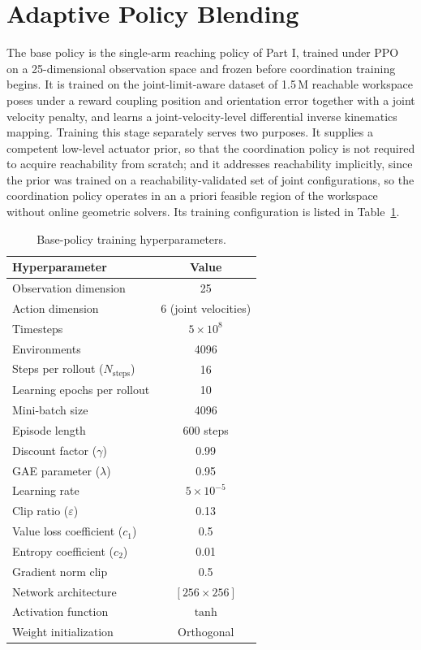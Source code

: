 \section{Adaptive Policy Blending}\label{sec:alpha_blending}

The base policy is the single-arm reaching policy of Part I, trained under PPO~\citep{schulman2017proximal}
on a 25-dimensional observation space and frozen before coordination training begins. It is trained on
the joint-limit-aware dataset of 1.5\,M reachable workspace poses under a reward coupling position and
orientation error together with a joint velocity penalty, and learns a joint-velocity-level
differential inverse kinematics mapping. Training this stage separately serves two purposes. It
supplies a competent low-level actuator prior, so that the coordination policy is not required to
acquire reachability from scratch; and it addresses reachability implicitly, since the prior was
trained on a reachability-validated set of joint configurations, so the coordination policy operates
in an a priori feasible region of the workspace without online geometric solvers. Its training
configuration is listed in Table~\ref{tab:alpha_basehyper}.

\begin{table}[htbp]
\centering
\caption{Base-policy training hyperparameters.}
\label{tab:alpha_basehyper}
\begin{tabular}{lc}
\toprule
\textbf{Hyperparameter} & \textbf{Value} \\
\midrule
Observation dimension       & 25 \\
Action dimension            & 6 (joint velocities) \\
Timesteps                   & $5 \times 10^{8}$ \\
Environments                & 4096 \\
Steps per rollout ($N_{\text{steps}}$) & 16 \\
Learning epochs per rollout & 10 \\
Mini-batch size             & 4096 \\
Episode length              & 600 steps \\
Discount factor ($\gamma$)  & 0.99 \\
GAE parameter ($\lambda$)   & 0.95 \\
Learning rate               & $5 \times 10^{-5}$ \\
Clip ratio ($\varepsilon$)     & 0.13 \\
Value loss coefficient ($c_1$) & 0.5 \\
Entropy coefficient ($c_2$) & 0.01 \\
Gradient norm clip          & 0.5 \\
Network architecture        & $[256 \times 256]$ \\
Activation function         & $\tanh$ \\
Weight initialization       & Orthogonal \\
\bottomrule
\end{tabular}
\end{table}

